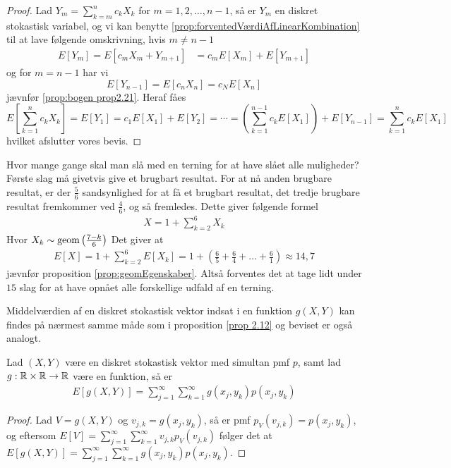 \begin{proof}
    Lad $Y_m = \sum_{k = m}^n c_k X_k$ for $m = 1, 2, \ldots, n - 1$, så er $Y_m$ en diskret stokastisk variabel, og vi kan benytte \ref{prop:forventedVærdiAfLinearKombination} til at lave følgende omskrivning, hvis $m \neq n - 1$
    \begin{align*}
        E\left[Y_m\right] = E\left[c_m X_m + Y_{m + 1} \right] &= c_m E[X_m] + E[Y_{m + 1}] 
    \end{align*}
    og for $m = n - 1$ har vi
    \begin{equation*}
        E[Y_{n - 1}] = E[c_n X_n] = c_N E[X_n]
    \end{equation*}
    jævnfør \ref{prop:bogen prop2.21}. Heraf fåes 
    \begin{equation*}
        E\left[\sum^n_{k = 1} c_k X_k\right] = E[Y_1] = c_1 E[X_1] + E[Y_2] = \cdots = \left(\sum^{n - 1}_{k = 1} c_k E[X_1]\right) + E[Y_{n - 1}] = \sum^n_{k = 1} c_k E[X_1]
    \end{equation*}
    hvilket afslutter vores bevis.
\end{proof}
\begin{exmp} %
    Hvor mange gange skal man slå med en terning for at have slået alle muligheder?
    Første slag må givetvis give et brugbart resultat. For at nå anden brugbare resultat, er der  $\frac{5}{6}$ sandsynlighed for at få et brugbart resultat, det tredje brugbare resultat fremkommer ved $\frac{4}{6}$, og så fremledes. Dette giver følgende formel
    \begin{align*}
        X=1+\sum^{6}_{k=2}X_k
    \end{align*}
    Hvor $X_k\sim \textnormal{geom}\left(\frac{7-k}{6}\right)$
    Det giver at 
    \begin{align*}
        E[X]=1+\sum^{6}_{k=2}E[X_k] = 1+ \left(\frac{6}{5}+\frac{6}{4}+\dots+\frac{6}{1}\right) \approx 14,7
    \end{align*}
    jævnfør proposition \ref{prop:geomEgenskaber}. Altså forventes det at tage lidt under $15$ slag for at have opnået alle forskellige udfald af en terning.
\end{exmp}

Middelværdien af en diskret stokastisk vektor indsat i en funktion $g(X,Y)$ kan findes på nærmest samme måde som i proposition \ref{prop 2.12} og beviset er også analogt. 
\begin{prop} \label{prop:prop3.11}%
    Lad $(X,Y)$ være en diskret stokastisk vektor med simultan pmf $p$, samt lad $g:\mathbb{R} \times \mathbb{R} \to \mathbb{R}$ være en funktion, så er 
    \begin{align*}
        E[g(X,Y)]=\sum_{j=1}^\infty \sum_{k=1}^\infty g(x_j,y_k)p(x_j,y_k)
    \end{align*}
\end{prop}
\begin{proof}
Lad $V = g(X,Y)$ og $v_{j,k} = g(x_j,y_k)$, så er pmf $p_V(v_{j,k}) = p(x_j,y_k)$, og eftersom 
$E[V] = \sum_{j=1}^\infty \sum_{k=1}^\infty v_{j,k} p_V(v_{j,k})$
følger det at $E[g(X,Y)] = \sum_{j=1}^\infty \sum_{k=1}^\infty g(x_j,y_k) p(x_j,y_k)$.
\end{proof}

